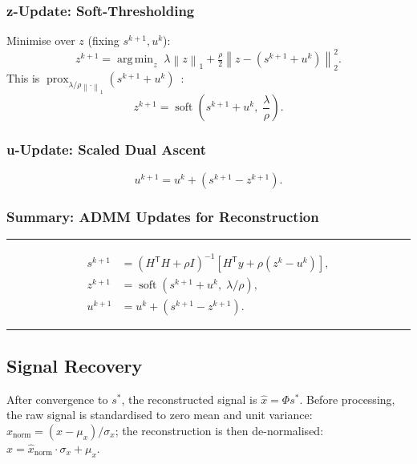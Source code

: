\documentclass[journal,twoside,10pt]{IEEEtran}
\DeclareMathOperator*{\argmin}{arg\,min}
\newcommand{\norm}[1]{\left\lVert#1\right\rVert}
\newcommand{\T}{^{\mathsf{T}}}
\begin{document}
\subsubsection{\textbf{z}-Update: Soft-Thresholding}

Minimise over $z$ (fixing $s^{k+1},u^k$):
\begin{equation}
  z^{k+1}=\argmin_z\;\lambda\norm{z}_1+\tfrac{\rho}{2}\norm{z-(s^{k+1}+u^k)}_2^2.
\end{equation}
This is $\operatorname{prox}_{\lambda/\rho\norm{\cdot}_1}(s^{k+1}+u^k)$~\cite{parikh2014}:
\begin{equation}
  \boxed{z^{k+1}=\operatorname{soft}\!\left(s^{k+1}+u^k,\;\frac{\lambda}{\rho}\right).}
  \label{eq:z_update_recon}
\end{equation}

\subsubsection{\textbf{u}-Update: Scaled Dual Ascent}

\begin{equation}
  \boxed{u^{k+1}=u^k+(s^{k+1}-z^{k+1}).}
  \label{eq:u_update_recon}
\end{equation}

\subsubsection{Summary: ADMM Updates for Reconstruction}

\noindent\rule{\linewidth}{0.4pt}
\begin{align}
  s^{k+1}&=(H\T H+\rho I)^{-1}[H\T y+\rho(z^k-u^k)],\tag{R1}\label{R1}\\
  z^{k+1}&=\operatorname{soft}(s^{k+1}+u^k,\;\lambda/\rho),\tag{R2}\label{R2}\\
  u^{k+1}&=u^k+(s^{k+1}-z^{k+1}).\tag{R3}\label{R3}
\end{align}
\noindent\rule{\linewidth}{0.4pt}

\subsection{Signal Recovery}
\label{ssec:signal_recovery}

After convergence to $s^*$, the reconstructed signal is $\hat{x}=\Phi s^*$.
Before processing, the raw signal is standardised to zero mean and unit variance:
$x_\mathrm{norm}=(x-\mu_x)/\sigma_x$; the reconstruction is then de-normalised:
$\hat{x}=\hat{x}_\mathrm{norm}\cdot\sigma_x+\mu_x$.
\end{document}
